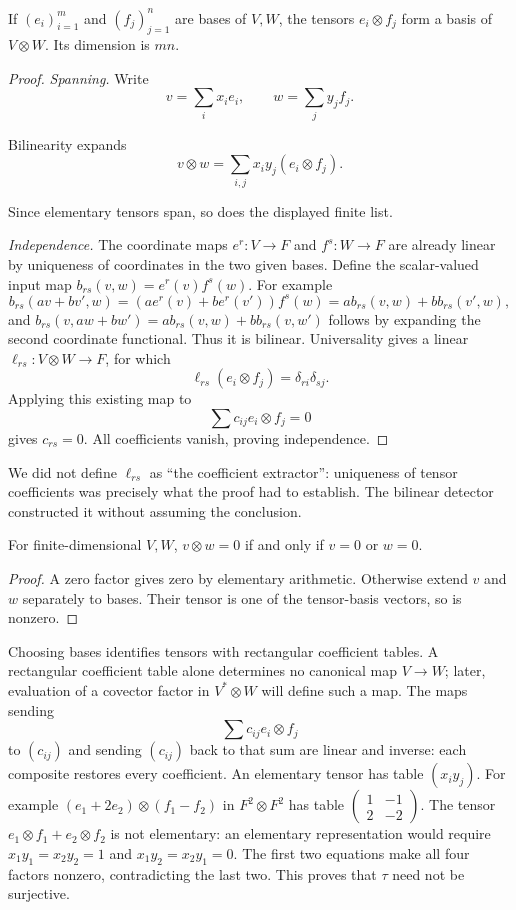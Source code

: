 \begin{theorem}\label{thm:tensor-basis}
If $(e_i)_{i=1}^m$ and $(f_j)_{j=1}^n$ are bases of $V,W$, the tensors
$e_i\otimes f_j$ form a basis of $V\otimes W$. Its dimension is $mn$.
\end{theorem}
\begin{proof}
\emph{Spanning.} Write
\[
v=\sum_i x_ie_i,\qquad w=\sum_j y_jf_j.
\]

Bilinearity expands
\[
v\otimes w=\sum_{i,j}x_iy_j(e_i\otimes f_j).
\]

Since elementary tensors span, so does the displayed finite list.

\emph{Independence.} The coordinate maps $e^r:V\to F$ and $f^s:W\to F$
are already linear by uniqueness of coordinates in the two given bases.
Define the scalar-valued input map $b_{rs}(v,w)=e^r(v)f^s(w)$.
For example
\[
b_{rs}(av+bv',w)=(ae^r(v)+be^r(v'))f^s(w)
=ab_{rs}(v,w)+bb_{rs}(v',w),
\]
and $b_{rs}(v,aw+bw')=ab_{rs}(v,w)+bb_{rs}(v,w')$ follows by expanding
the second coordinate functional. Thus it is bilinear. Universality gives
a linear $\ell_{rs}:V\otimes W\to F$, for which
\[
\ell_{rs}(e_i\otimes f_j)=\delta_{ri}\delta_{sj}.
\]
Applying this existing map to
\[
\sum c_{ij}e_i\otimes f_j=0
\]
 gives
$c_{rs}=0$. All coefficients vanish, proving independence.
\end{proof}
We did not define $\ell_{rs}$ as ``the coefficient extractor'': uniqueness
of tensor coefficients was precisely what the proof had to establish.
The bilinear detector constructed it without assuming the conclusion.
\begin{proposition}
For finite-dimensional $V,W$, $v\otimes w=0$ if and only if $v=0$ or $w=0$.
\end{proposition}
\begin{proof}
A zero factor gives zero by elementary arithmetic. Otherwise extend $v$
and $w$ separately to bases. Their tensor is one of the tensor-basis
vectors, so is nonzero.
\end{proof}
\begin{example}
Choosing bases identifies tensors with rectangular coefficient tables.
A rectangular coefficient table alone determines no canonical map
$V\to W$; later, evaluation of a covector factor in $V^*\otimes W$
will define such a map.
The maps sending
\[
\sum c_{ij}e_i\otimes f_j
\]
 to $(c_{ij})$ and sending
$(c_{ij})$ back to that sum are linear and inverse: each composite restores
every coefficient. An elementary tensor has table $(x_iy_j)$. For example
$(e_1+2e_2)\otimes(f_1-f_2)$ in $F^2\otimes F^2$ has table
$\left(\begin{matrix}1&-1\\2&-2\end{matrix}\right)$.
The tensor $e_1\otimes f_1+e_2\otimes f_2$ is not elementary: an
elementary representation would require $x_1y_1=x_2y_2=1$ and
$x_1y_2=x_2y_1=0$. The first two equations make all four factors nonzero,
contradicting the last two. This proves that $\tau$ need not be surjective.
\end{example}

